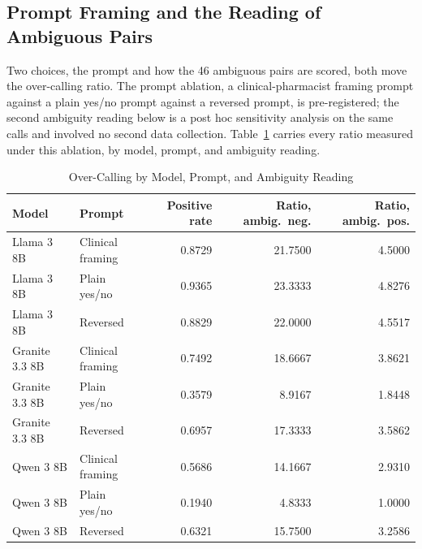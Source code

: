 \subsection{Prompt Framing and the Reading of Ambiguous Pairs}

Two choices, the prompt and how the 46 ambiguous pairs are scored, both move
the over-calling ratio. The prompt ablation, a
clinical-pharmacist framing prompt against a plain yes/no prompt against a
reversed prompt, is pre-registered; the second ambiguity reading below is a
post hoc sensitivity analysis on the same calls and involved no second data collection. Table~\ref{tab:promptamb}
carries every ratio measured under this ablation, by model, prompt, and
ambiguity reading.

\begin{table}[!htbp]
\caption{Over-Calling by Model, Prompt, and Ambiguity Reading}
\label{tab:promptamb}
\centering
\small
\setlength{\tabcolsep}{4pt}
\begin{tabular}{@{}llrrr@{}}
\toprule
\textbf{Model} & \textbf{Prompt} & \textbf{Positive rate} & \textbf{Ratio, ambig.\ neg.} & \textbf{Ratio, ambig.\ pos.} \\
\midrule
Llama 3 8B & Clinical framing & 0.8729 & 21.7500 & 4.5000 \\
Llama 3 8B & Plain yes/no & 0.9365 & 23.3333 & 4.8276 \\
Llama 3 8B & Reversed & 0.8829 & 22.0000 & 4.5517 \\
Granite 3.3 8B & Clinical framing & 0.7492 & 18.6667 & 3.8621 \\
Granite 3.3 8B & Plain yes/no & 0.3579 & 8.9167 & 1.8448 \\
Granite 3.3 8B & Reversed & 0.6957 & 17.3333 & 3.5862 \\
Qwen 3 8B & Clinical framing & 0.5686 & 14.1667 & 2.9310 \\
Qwen 3 8B & Plain yes/no & 0.1940 & 4.8333 & 1.0000 \\
Qwen 3 8B & Reversed & 0.6321 & 15.7500 & 3.2586 \\
\bottomrule
\end{tabular}
\end{table}

